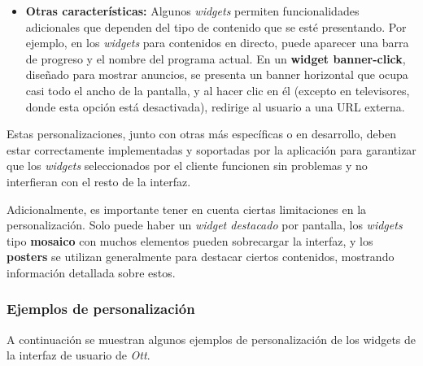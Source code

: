 \begin{itemize}
    \item \textbf{Otras características:} Algunos \textit{widgets} permiten funcionalidades adicionales que dependen del tipo de contenido que se esté 
    presentando. Por ejemplo, en los \textit{widgets} para contenidos en directo, puede aparecer una barra de progreso y el nombre del programa actual. 
    En un \textbf{widget banner-click}, diseñado para mostrar anuncios, se presenta un banner horizontal que ocupa casi todo el ancho de la pantalla, 
    y al hacer clic en él (excepto en televisores, donde esta opción está desactivada), redirige al usuario a una URL externa.
\end{itemize}

Estas personalizaciones, junto con otras más específicas o en desarrollo, deben estar correctamente implementadas y soportadas por la aplicación 
para garantizar que los \textit{widgets} seleccionados por el cliente funcionen sin problemas y no interfieran con el resto de la interfaz.

Adicionalmente, es importante tener en cuenta ciertas limitaciones en la personalización. Solo puede haber un \textit{widget destacado} por 
pantalla, los \textit{widgets} tipo \textbf{mosaico} con muchos elementos pueden sobrecargar la interfaz, y los \textbf{posters} se utilizan generalmente 
para destacar ciertos contenidos, mostrando información detallada sobre estos.

\subsubsection{Ejemplos de personalización}
\label{sec:diseno-ux-ejemplos}

A continuación se muestran algunos ejemplos de personalización de los widgets de la interfaz de usuario de \textit{Ott}.


